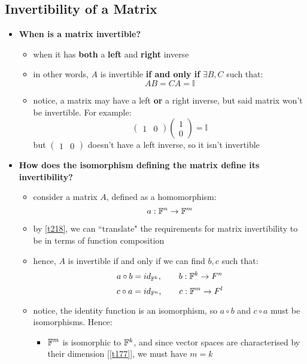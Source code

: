 \documentclass{exam}
\begin{document}
\subsection{Invertibility of a Matrix}

\begin{itemize}
    \item \textbf{When is a matrix invertible?}
    \begin{itemize}
        \item when it has \textbf{both} a \textbf{left} and \textbf{right} inverse
        \item in other words, $A$ is invertible \textbf{if and only if} $\exists B,C$ such that:
        \[
        AB = CA = \mathbb{I}
        \]
        \item notice, a matrix may have a left \textbf{or} a right inverse, but said matrix won't be invertible. For example:
        \[
        \begin{pmatrix}
        1 & 0
        \end{pmatrix}
        \begin{pmatrix}
        1 \\
        0
        \end{pmatrix}
        = \mathbb{I}
        \]
        but $\begin{pmatrix}
        1 & 0
        \end{pmatrix}$ doesn't have a left inverse, so it isn't invertible
    \end{itemize}
    \item \textbf{How does the isomorphism defining the matrix define its invertibility?}
    \begin{itemize}
        \item consider a matrix $A$, defined as a homomorphism:
        \[
        a : \mathbb{F}^n \to \mathbb{F}^m
        \]
        \item by \eqref{t218}, we can ``translate" the requirements for matrix invertibility to be in terms of function composition
        \item hence, $A$ is invertible if and only if we can find $b,c$ such that:
        \[
        a \circ b = id_{\mathbb{F}^k}, \qquad b : \mathbb{F}^k \to F^n
        \]
        \[
        c \circ a = id_{\mathbb{F}^n}, \qquad c : \mathbb{F}^m\to F^l
        \]
        \item notice, the identity function is an isomorphism, so $a \circ b$ and $c \circ a$ must be isomorphisms. Hence:  
        \begin{itemize}
            \item $\mathbb{F}^m$ is isomorphic to $\mathbb{F}^k$, and since vector spaces are characterised by their dimension [\eqref{t177}], we must have $m = k$

\end{itemize}
\end{itemize}
\end{itemize}
\end{document}
